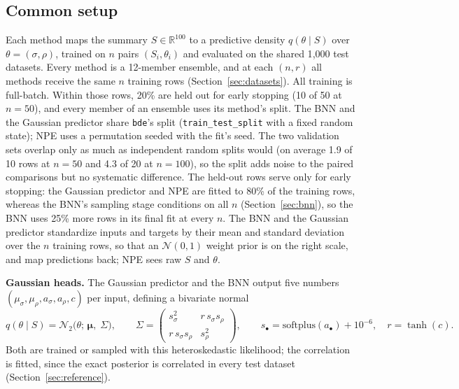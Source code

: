 \documentclass[11pt]{article}
\newcommand{\code}[1]{\texttt{#1}}
\begin{document}
\subsection{Common setup}
\label{sec:setup}
Each method maps the summary $S\in\mathbb{R}^{100}$ to a predictive density $q(\theta\mid S)$ over
$\theta=(\sigma,\rho)$, trained on $n$ pairs $(S_i,\theta_i)$ and evaluated on the shared 1{,}000 test datasets. Every
method is a 12-member ensemble, and at each $(n,r)$ all methods receive the same $n$ training rows
(Section~\ref{sec:datasets}). All training is full-batch. Within those rows, 20\% are held out for early stopping (10
of 50 at $n=50$), and every member of an ensemble uses its method's split. The BNN and the Gaussian predictor share
\code{bde}'s split (\code{train\_test\_split} with a fixed random state); NPE uses a permutation seeded with the fit's
seed. The two validation sets overlap only as much as independent random splits would (on average 1.9 of 10 rows at
$n=50$ and 4.3 of 20 at $n=100$), so the split adds noise to the paired comparisons but no systematic difference. The
held-out rows serve only for early stopping: the Gaussian predictor and NPE are fitted to 80\% of the training rows,
whereas the BNN's sampling stage conditions on all $n$ (Section~\ref{sec:bnn}), so the BNN uses 25\% more rows in its
final fit at every $n$. The BNN and the Gaussian predictor standardize inputs and targets by their mean and standard
deviation over the $n$ training rows, so that an $\mathcal{N}(0,1)$ weight prior is on the right scale, and map
predictions back; NPE sees raw $S$ and $\theta$.

\textbf{Gaussian heads.} The Gaussian predictor and the BNN output five numbers
$(\mu_\sigma,\mu_\rho,a_\sigma,a_\rho,c)$ per input, defining a bivariate normal
\begin{equation}
\label{eq:biv}
q(\theta\mid S)=\mathcal{N}_2\!\big(\theta;\,\boldsymbol\mu,\;\Sigma\big),\qquad
\Sigma=\begin{pmatrix}s_\sigma^2 & r\,s_\sigma s_\rho\\ r\,s_\sigma s_\rho & s_\rho^2\end{pmatrix},\qquad
s_\bullet=\mathrm{softplus}(a_\bullet)+10^{-6},\quad r=\tanh(c).
\end{equation}
Both are trained or sampled with this heteroskedastic likelihood; the correlation is fitted, since the exact posterior
is correlated in every test dataset (Section~\ref{sec:reference}).
\end{document}
